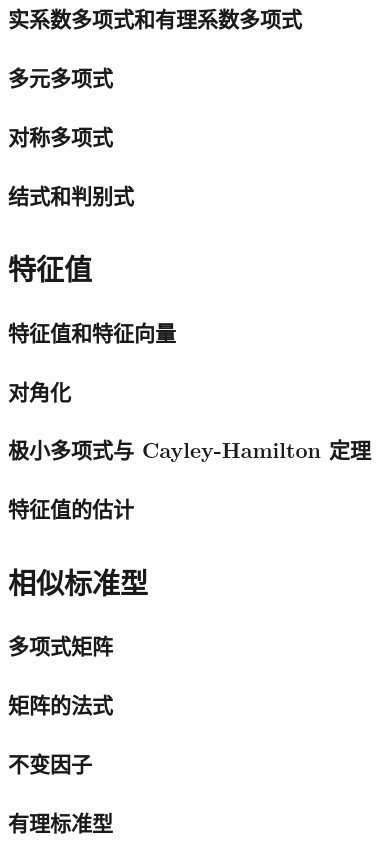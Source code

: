 \documentclass[a4paper, 11pt]{ctexbook}
\begin{document}
        \section{实系数多项式和有理系数多项式}
        \section{多元多项式}
        \section{对称多项式}
        \section{结式和判别式}
    \chapter{特征值}
        \section{特征值和特征向量}
        \section{对角化}
        \section{极小多项式与 Cayley-Hamilton 定理}
        \section{特征值的估计}
    \chapter{相似标准型}
        \section{多项式矩阵}
        \section{矩阵的法式}
        \section{不变因子}
        \section{有理标准型}
\end{document}
